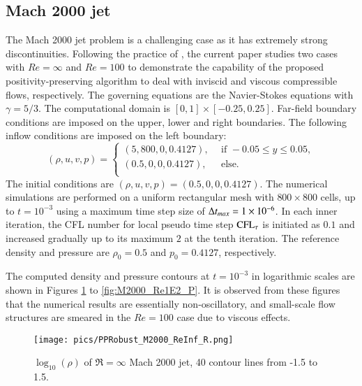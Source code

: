 \subsection{Mach 2000 jet}

The Mach 2000 jet problem \cite{zhang2010positivity} is a challenging case as it has extremely strong discontinuities.
Following the practice of \cite{huang2024general},
the current paper studies two cases with $Re=\infty$ and $Re=100$ to demonstrate the capability of the proposed positivity-preserving algorithm to deal with inviscid and viscous compressible flows, respectively.
The governing equations are the Navier-Stokes equations with $\gamma=5/3$.
The computational domain is $[0,1]\times[-0.25,0.25]$.
Far-field boundary conditions are imposed on the upper, lower and right boundaries. The following inflow conditions are imposed on the left boundary:
\begin{equation}
    (\rho,u,v,p) = \left\{
    \begin{array}{ll}
        (5,800,0,0.4127),\ \  & \text{if } -0.05 \leq y \leq 0.05, \\
        (0.5,0,0,0.4127),\ \  & \text{else}.                       \\
    \end{array}
    \right.
\end{equation}
The initial conditions are $(\rho,u,v,p)=(0.5,0,0,0.4127)$.
The numerical simulations are performed on a uniform rectangular mesh with $800 \times 800$ cells, up to $t=10^{-3}$ using a maximum time step size of $\mathrm\Delta t_{max} = 1\times10^{-6}$.
In each inner iteration, the CFL number for local pseudo time step $\text{CFL}_\tau$ is initiated as $0.1$
and increased gradually up to its maximum $2$ at the tenth iteration.
The reference density and pressure are
$\rho_0=0.5$ and $p_0=0.4127$, respectively.

The computed density and pressure contours at $t=10^{-3}$ in logarithmic scales are shown in Figures \ref{fig:M2000_ReInf_R} to \ref{fig:M2000_Re1E2_P}.
It is observed from these figures that the numerical results are essentially non-oscillatory, and small-scale flow structures are smeared in the $Re=100$ case due to viscous effects.

\begin{figure}[htbp]
    \centering
    \texttt{[image: pics/PPRobust\_M2000\_ReInf\_R.png]}
    \caption{$\log_{10}(\rho)$ of $\Re=\infty$ Mach 2000 jet, 40 contour lines from -1.5 to 1.5.}
    \label{fig:M2000_ReInf_R}
\end{figure}

